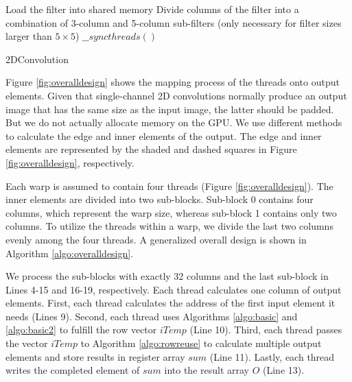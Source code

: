 \begin{algorithm}
	Load the filter into shared memory\;
	Divide columns of the filter into a combination of 3-column and 5-column sub-filters (only necessary for filter sizes larger than $5 \times 5$)\;
	$\_\_syncthreads()$\;
	\caption{2DConvolution}
	\label{algo:overalldesign}
\end{algorithm}

Figure \ref{fig:overalldesign} shows the mapping process of the threads onto output elements. Given that single-channel 2D convolutions normally produce an output image that has the same size as the input image, the latter should be padded. But we do not actually allocate memory on the GPU. We use different methods to calculate the edge and inner elements of the output. The edge and inner elements are represented by the shaded and dashed squares in Figure \ref{fig:overalldesign}, respectively.

Each warp is assumed to contain four threads (Figure \ref{fig:overalldesign}). The inner elements are divided into two
sub-blocks. Sub-block 0 contains four columns, which represent the warp size, whereas sub-block 1 contains only two columns. To utilize the threads within a warp, we divide the last two columns evenly among the four threads. A generalized overall design is shown in Algorithm \ref{algo:overalldesign}.

We process the sub-blocks with exactly 32 columns and the last sub-block in Lines 4-15 and 16-19, respectively. Each thread calculates one column of output elements. First, each thread calculates the address of the first input element it needs (Lines 9). Second, each thread uses Algorithms \ref{algo:basic} and \ref{algo:basic2} to fulfill the row vector $iTemp$ (Line 10). Third, each thread passes the
vector $iTemp$ to Algorithm \ref{algo:rowreuse} to calculate multiple output elements and store results in register array $sum$ (Line 11).
Lastly, each thread writes the completed element of $sum$ into the result array $O$ (Line 13).


